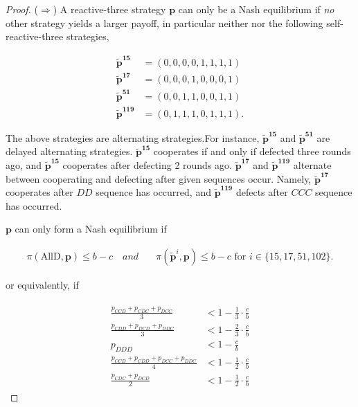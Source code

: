 \documentclass{article}
\theoremstyle{definition}
\begin{document}
\begin{proof}
($\Rightarrow$) A reactive-three strategy \(\mathbf{p}\) can only
be a Nash equilibrium if {\it no} other strategy yields a larger payoff, in
particular neither  nor the following self-reactive-three strategies,

\begin{align*}
\mathbf{\tilde{p}^{15}} & = (0, 0, 0, 0, 1, 1, 1, 1) \\
\mathbf{\tilde{p}^{17}} & = (0, 0, 0, 1, 0, 0, 0, 1) \\
\mathbf{\tilde{p}^{51}} & = (0, 0, 1, 1, 0, 0, 1, 1) \\
\mathbf{\tilde{p}^{119}} & = (0, 1, 1, 1, 0, 1, 1, 1).
\end{align*}

The above strategies are alternating strategies.For instance,
\(\mathbf{\tilde{p}^{15}}\) and \(\mathbf{\tilde{p}^{51}}\) are delayed
alternating strategies. \(\mathbf{\tilde{p}^{15}}\) cooperates if and only if
defected three rounds ago, and \(\mathbf{\tilde{p}^{15}}\) cooperates after
defecting 2 rounds ago. \(\mathbf{\tilde{p}^{17}}\) and
\(\mathbf{\tilde{p}^{119}}\) alternate between cooperating and defecting after
given sequences occur. Namely,
\(\mathbf{\tilde{p}^{17}}\) cooperates after $DD$ sequence has occurred, and
\(\mathbf{\tilde{p}^{119}}\) defects after $CCC$ sequence has occurred.

\(\mathbf{p}\) can only form a Nash equilibrium if

\begin{align*}
\pi(\text{AllD}, \mathbf{p}) \leq b\!-\!c \quad { and } \quad & \pi(\mathbf{\tilde{p}}^{i}, \mathbf{p}) \leq b\!-\!c \text{ for } i \in \{15, 17, 51, 102\}.
\end{align*}

or equivalently, if

\begin{align}\label{Eq:NashConditionDonationGameN3}
  \begin{split}
    \frac{p_{CCD} + p_{CDC} + p_{DCC}}{3} & < 1\!-\! \frac{1}{3} \cdot \frac{c}{b} \\
    \frac{p_{CDD} + p_{DCD} + p_{DDC}}{3} & < 1\!-\! \frac{2}{3} \cdot \frac{c}{b} \\
    p_{DDD} & < 1\!-\! \frac{c}{b} \\
    \frac{p_{CCD} + p_{CDD} + p_{DCC} + p_{DDC}}{4}  & < 1\!-\! \frac{1}{2} \cdot \frac{c}{b} \\
    \frac{p_{CDC} + p_{DCD}}{2} & < 1\!-\! \frac{1}{2} \cdot \frac{c}{b}
  \end{split}
\end{align}


\end{proof}
\end{document}
